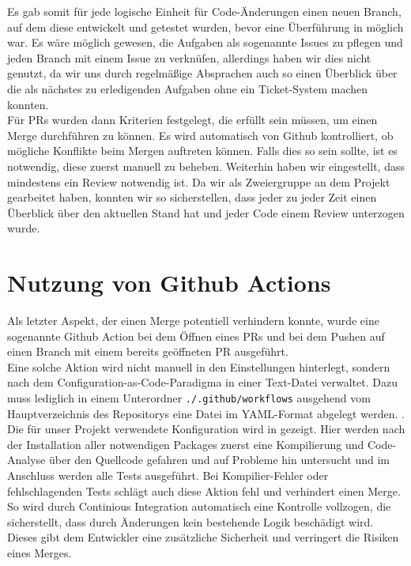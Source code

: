 Es gab somit für jede logische Einheit für Code-Änderungen einen neuen Branch, auf dem diese entwickelt und getestet
wurden, bevor eine Überführung in  möglich war.
Es wäre möglich gewesen, die Aufgaben als sogenannte Issues zu pflegen und jeden Branch mit einem Issue zu verknüfen,
allerdings haben wir dies nicht genutzt, da wir uns durch regelmäßige Absprachen auch so einen Überblick über die
als nächstes zu erledigenden Aufgaben ohne ein Ticket-System machen konnten. \\

Für \ac{PR}s wurden dann Kriterien festgelegt, die erfüllt sein müssen, um einen Merge durchführen zu können.
Es wird automatisch von Github kontrolliert, ob mögliche Konflikte beim Mergen auftreten können.
Falls dies so sein sollte, ist es notwendig, diese zuerst manuell zu beheben.
Weiterhin haben wir eingestellt, dass mindestens ein Review notwendig ist.
Da wir als Zweiergruppe an dem Projekt gearbeitet haben, konnten wir so sicherstellen, dass jeder zu jeder Zeit einen
Überblick über den aktuellen Stand hat und jeder Code einem Review unterzogen wurde.

\section{Nutzung von Github Actions}
\label{sec:github-actions}

Als letzter Aspekt, der einen Merge potentiell verhindern konnte, wurde eine sogenannte Github Action bei dem Öffnen
eines \ac{PR}s und bei dem Pushen auf einen Branch mit einem bereits geöffneten \ac{PR} ausgeführt. \\

Eine solche Aktion wird nicht manuell in den Einstellungen hinterlegt, sondern nach dem
Configuration-as-Code-Paradigma in einer Text-Datei verwaltet.
Dazu muss lediglich in einem Unterordner \texttt{./.github/workflows} ausgehend vom Hauptverzeichnis des Repositorys
eine Datei im YAML-Format abgelegt werden.  . \\

Die für unser Projekt verwendete Konfiguration wird in  gezeigt.
Hier werden nach der Installation aller notwendigen Packages zuerst eine Kompilierung und Code-Analyse über den
Quellcode gefahren und auf Probleme hin untersucht und im Anschluss werden alle Tests ausgeführt.
Bei Kompilier-Fehler oder fehlschlagenden Tests schlägt auch diese Aktion fehl und verhindert einen Merge. \\

So wird durch Continious Integration automatisch eine Kontrolle vollzogen, die sicherstellt, dass durch Änderungen
kein bestehende Logik beschädigt wird.
Dieses gibt dem Entwickler eine zusätzliche Sicherheit und verringert die Risiken eines Merges.